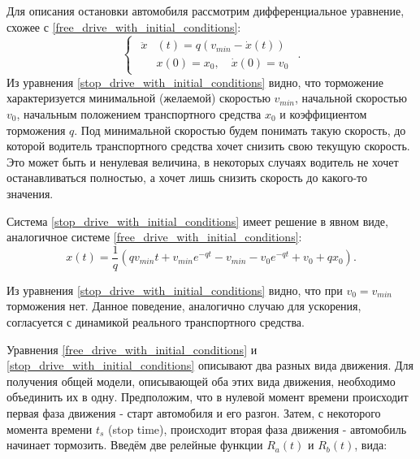 \documentclass[12pt, a4paper]{extarticle}
\numberwithin{equation}{section}
\numberwithin{figure}{section}
\begin{document}
Для описания остановки автомобиля рассмотрим дифференциальное уравнение, схожее с \eqref{free_drive_with_initial_conditions}: 
\begin{equation} \label{stop_drive_with_initial_conditions}
\begin{cases}
\begin{split}
\ddot{x}&(t) = q\left( v_{min} - \dot{x}(t)\right) \\
&x(0)=x_0, \quad \dot{x}(0)=v_0
\end{split}
\end{cases}.
\end{equation}
Из уравнения \eqref{stop_drive_with_initial_conditions} видно, что торможение характеризуется минимальной (желаемой) скоростью $v_{min}$, начальной скоростью $v_{0}$, начальным положением транспортного средства $x_0$ и коэффициентом торможения $q$. Под минимальной скоростью будем понимать такую скорость, до которой водитель транспортного средства хочет снизить свою текущую скорость. Это может быть и ненулевая величина, в некоторых случаях водитель не хочет останавливаться полностью, а хочет лишь снизить скорость до какого-то значения.

Система \eqref{stop_drive_with_initial_conditions} имеет решение в явном виде, аналогичное системе \eqref{free_drive_with_initial_conditions}:
\begin{equation*}
x(t) = \dfrac{1}{q}\left(qv_{min}t+v_{min}e^{-qt}-v_{min}-v_0e^{-qt}+v_0+qx_0\right).
\end{equation*}

Из уравнения \eqref{stop_drive_with_initial_conditions} видно, что при $v_0=v_{min}$ торможения нет. Данное поведение, аналогично случаю для ускорения, согласуется с динамикой реального транспортного средства.

Уравнения \eqref{free_drive_with_initial_conditions} и  \eqref{stop_drive_with_initial_conditions} описывают два разных вида движения. Для получения общей модели, описывающей оба этих вида движения, необходимо объединить их в одну. Предположим, что в нулевой момент времени происходит первая фаза движения - старт автомобиля и его разгон. Затем, с некоторого момента времени $t_s$ (stop time), происходит вторая фаза движения - автомобиль начинает тормозить. Введём две релейные функции $R_{a}(t)$ и $R_{b}(t)$, вида:  
\end{document}
